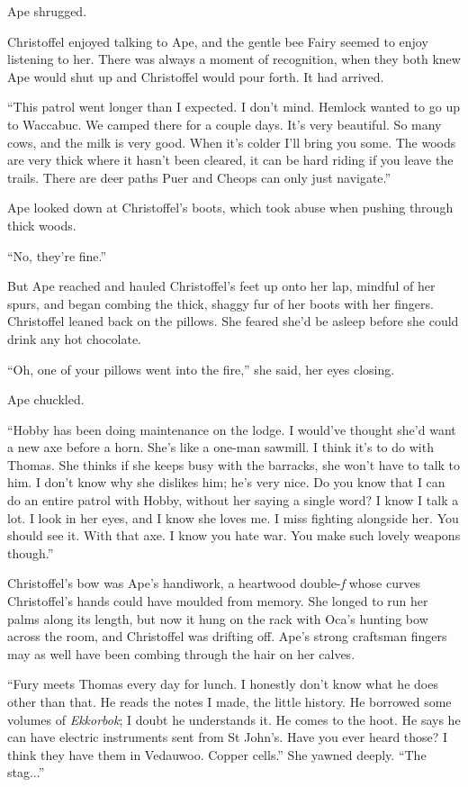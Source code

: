 \documentclass[11pt,a5paper]{article}
\begin{document}
Ape shrugged.

Christoffel enjoyed talking to Ape, and the gentle bee Fairy seemed to enjoy listening to her. There was always a moment of recognition, when they both knew Ape would shut up and Christoffel would pour forth. It had arrived.

``This patrol went longer than I expected. I don't mind. Hemlock wanted to go up to Waccabuc. We camped there for a couple days. It's very beautiful. So many cows, and the milk is very good. When it's colder I'll bring you some. The woods are very thick where it hasn't been cleared, it can be hard riding if you leave the trails. There are deer paths Puer and Cheops can only just navigate.''

Ape looked down at Christoffel's boots, which took abuse when pushing through thick woods.

``No, they're fine.''

But Ape reached and hauled Christoffel's feet up onto her lap, mindful of her spurs, and began combing the thick, shaggy fur of her boots with her fingers. Christoffel leaned back on the pillows. She feared she'd be asleep before she could drink any hot chocolate.

``Oh, one of your pillows went into the fire,'' she said, her eyes closing.

Ape chuckled.

``Hobby has been doing maintenance on the lodge. I would've thought she'd want a new axe before a horn. She's like a one-man sawmill. I think it's to do with Thomas. She thinks if she keeps busy with the barracks, she won't have to talk to him. I don't know why she dislikes him; he's very nice. Do you know that I can do an entire patrol with Hobby, without her saying a single word? I know I talk a lot. I look in her eyes, and I know she loves me. I miss fighting alongside her. You should see it. With that axe. I know you hate war. You make such lovely weapons though.''

Christoffel's bow was Ape's handiwork, a heartwood double-\emph{f} whose curves Christoffel's hands could have moulded from memory. She longed to run her palms along its length, but now it hung on the rack with Oca's hunting bow across the room, and Christoffel was drifting off. Ape's strong craftsman fingers may as well have been combing through the hair on her calves.

``Fury meets Thomas every day for lunch. I honestly don't know what he does other than that. He reads the notes I made, the little history. He borrowed some volumes of \emph{Ekkorbok}; I doubt he understands it. He comes to the hoot. He says he can have electric instruments sent from St John's. Have you ever heard those? I think they have them in Vedauwoo. Copper cells.'' She yawned deeply. ``The stag...''
\end{document}
